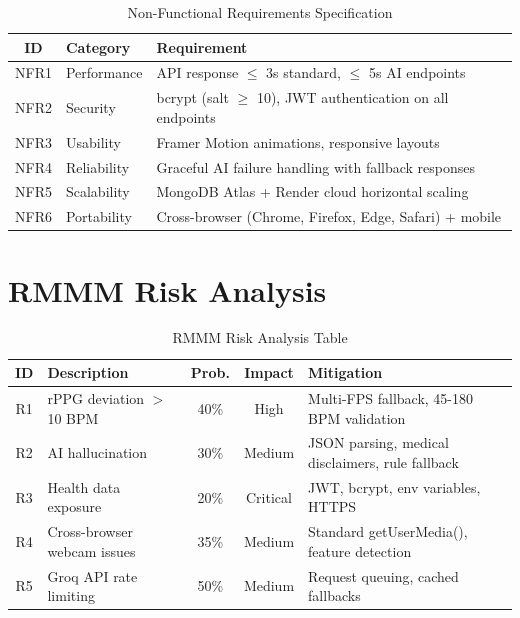 \documentclass[12pt,a4paper]{report}
\begin{document}
\begin{table}[H]
\centering
\caption{Non-Functional Requirements Specification}
\label{tab:nfr}
\begin{tabular}{|c|l|p{8cm}|}
\hline
\textbf{ID} & \textbf{Category} & \textbf{Requirement} \\
\hline
NFR1 & Performance & API response $\leq$ 3s standard, $\leq$ 5s AI endpoints \\
NFR2 & Security & bcrypt (salt $\geq$ 10), JWT authentication on all endpoints \\
NFR3 & Usability & Framer Motion animations, responsive layouts \\
NFR4 & Reliability & Graceful AI failure handling with fallback responses \\
NFR5 & Scalability & MongoDB Atlas + Render cloud horizontal scaling \\
NFR6 & Portability & Cross-browser (Chrome, Firefox, Edge, Safari) + mobile \\
\hline
\end{tabular}
\end{table}

\section{RMMM Risk Analysis}

\begin{table}[H]
\centering
\caption{RMMM Risk Analysis Table}
\label{tab:rmmm}
\small
\begin{tabular}{|c|p{4cm}|c|c|p{4.5cm}|}
\hline
\textbf{ID} & \textbf{Description} & \textbf{Prob.} & \textbf{Impact} & \textbf{Mitigation} \\
\hline
R1 & rPPG deviation $>$10 BPM & 40\% & High & Multi-FPS fallback, 45-180 BPM validation \\
R2 & AI hallucination & 30\% & Medium & JSON parsing, medical disclaimers, rule fallback \\
R3 & Health data exposure & 20\% & Critical & JWT, bcrypt, env variables, HTTPS \\
R4 & Cross-browser webcam issues & 35\% & Medium & Standard getUserMedia(), feature detection \\
R5 & Groq API rate limiting & 50\% & Medium & Request queuing, cached fallbacks \\
\hline
\end{tabular}
\end{table}

\end{document}
